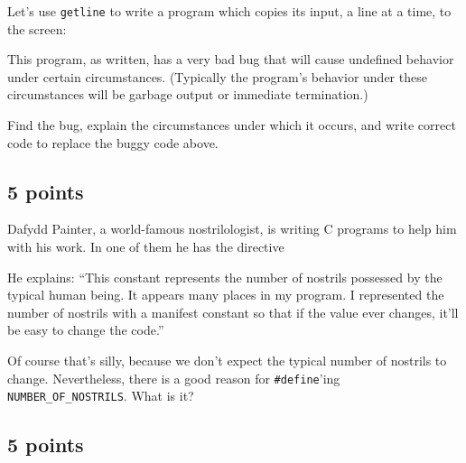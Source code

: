 Let's use {\tt getline} to write a program which copies its input, a
line at a time, to the screen:

\begin{flushleft}
\verb% char * getline(void);% \\*
\verb% int main(void) % \\*
\verb% {% \\*
\verb%   char *s;% \\*
\verb% % \\*
\verb%   while(1) {% \\*
\verb%     s = getline(); % \\*
\verb%     printf(s); % \\*
\verb%   }% \\*
\verb% }% \\*
\end{flushleft}

This program, as written, has a very bad bug that will cause undefined
behavior under certain circumstances.  (Typically the program's behavior
under these circumstances will be garbage output or immediate
termination.)

Find the bug, explain the circumstances under which it occurs, and
write correct code to replace the buggy code above.

\subsection{5 points} 
Dafydd Painter, a world-famous nostrilologist, is writing C programs to
help him with his work.  In one of them he has the directive

\begin{flushleft}
\verb% 	#define NUMBER_OF_NOSTRILS 2% \\*
\end{flushleft}

    He explains: ``This constant represents the number of nostrils
possessed by the typical human being.  It appears many places in my
program.  I represented the number of nostrils with a manifest constant
so that if the value ever changes, it'll be easy to change the code.''

    Of course that's silly, because we don't expect the typical number
of nostrils to change.  Nevertheless, there is a good reason for
{\tt\#define}'ing {\tt NUMBER\_OF\_NOSTRILS}.  What is it?

\subsection{5 points}

